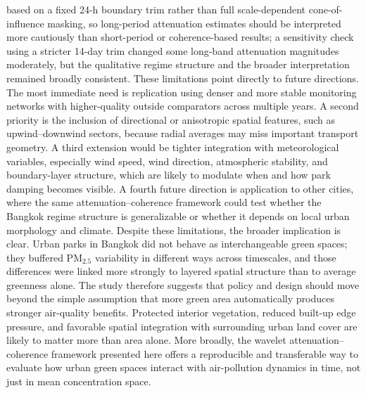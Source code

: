 based on a fixed 24-h boundary trim rather than full scale-dependent cone-of-influence masking, so long-period attenuation estimates should be interpreted more cautiously than short-period or coherence-based results; a sensitivity check using a stricter 14-day trim changed some long-band attenuation magnitudes moderately, but the qualitative regime structure and the broader interpretation remained broadly consistent. These limitations point directly to future directions. The most immediate need is replication using denser and more stable monitoring networks with higher-quality outside comparators across multiple years. A second priority is the inclusion of directional or anisotropic spatial features, such as upwind--downwind sectors, because radial averages may miss important transport geometry. A third extension would be tighter integration with meteorological variables, especially wind speed, wind direction, atmospheric stability, and boundary-layer structure, which are likely to modulate when and how park damping becomes visible. A fourth future direction is application to other cities, where the same attenuation--coherence framework could test whether the Bangkok regime structure is generalizable or whether it depends on local urban morphology and climate. Despite these limitations, the broader implication is clear. Urban parks in Bangkok did not behave as interchangeable green spaces; they buffered PM$_{2.5}$ variability in different ways across timescales, and those differences were linked more strongly to layered spatial structure than to average greenness alone. The study therefore suggests that policy and design should move beyond the simple assumption that more green area automatically produces stronger air-quality benefits. Protected interior vegetation, reduced built-up edge pressure, and favorable spatial integration with surrounding urban land cover are likely to matter more than area alone. More broadly, the wavelet attenuation--coherence framework presented here offers a reproducible and transferable way to evaluate how urban green spaces interact with air-pollution dynamics in time, not just in mean concentration space.